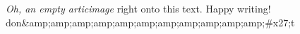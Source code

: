 \textit{Oh, an empty articimage} right onto this text. Happy writing! 
don&amp;amp;amp;amp;amp;amp;amp;amp;amp;amp;amp;#x27;t